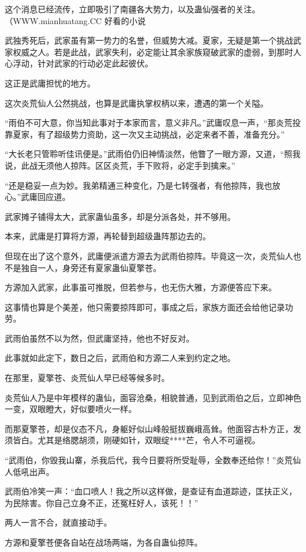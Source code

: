 \begin{this_body}
这个消息已经流传，立即吸引了南疆各大势力，以及蛊仙强者的关注。（WWW.mianhuatang.CC 好看的小说

武独秀死后，武家虽有第一势力的名誉，但威势大减。夏家，无疑是第一个挑战武家权威之人。若是此战，武家失利，必定能让其余家族窥破武家的虚弱，到那时人心浮动，针对武家的行动必定此起彼伏。

这正是武庸担忧的地方。

这次炎荒仙人公然挑战，也算是武庸执掌权柄以来，遭遇的第一个关隘。

“雨伯不可大意，你当知此事对于本家而言，意义非凡。”武庸叹息一声，“那炎荒投靠夏家，有了超级势力资助，这一次又主动挑战，必定来者不善，准备充分。”

“大长老只管聆听佳讯便是。”武雨伯仍旧神情淡然，他瞥了一眼方源，又道，“照我说，此战无须他人掠阵。区区炎荒，手下败将，必定手到擒来。”

“还是稳妥一点为妙。我弟精通三种变化，乃是七转强者，有他掠阵，我也放心。”武庸回应道。

武家摊子铺得太大，武家蛊仙虽多，却是分派各处，并不够用。

本来，武庸是打算将方源，再轮替到超级蛊阵那边去的。

但现在出了这个意外，武庸便派遣方源去为武雨伯掠阵。毕竟这一次，炎荒仙人也不是独自一人，身旁还有夏家蛊仙夏擎苍。

方源加入武家，此事虽可推脱，但若参与，也无伤大雅，方源便答应下来。

这事情也算是个美差，他只需要掠阵即可，事成之后，家族方面还会给他记录功劳。

武雨伯虽然不以为然，但武庸坚持，他也不好反对。

此事就如此定下，数日之后，武雨伯和方源二人来到约定之地。

在那里，夏擎苍、炎荒仙人早已经等候多时。

炎荒仙人乃是中年模样的蛊仙，面容沧桑，相貌普通，见到武雨伯之后，立即神色一变，双眼瞪大，好似要喷火一样。

而那夏擎苍，却是仪态不凡，身躯好似山峰般挺拔巍峨高耸。他面容古朴方正，发须皆白。尤其是络腮胡须，刚硬如针，双眼绽****芒，令人不可逼视。

“武雨伯，你毁我山寨，杀我后代，我今日要将所受耻辱，全数奉还给你！”炎荒仙人低吼出声。

武雨伯冷笑一声：“血口喷人！我之所以这样做，是查证有血道踪迹，匡扶正义，为民除害。你自己立身不正，还冤枉好人，该死！！”

两人一言不合，就直接动手。

方源和夏擎苍便各自站在战场两端，为各自蛊仙掠阵。


\end{this_body}
